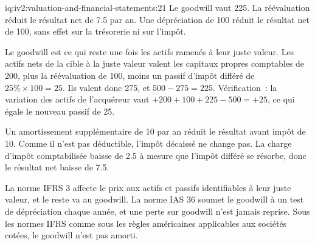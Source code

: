 \begin{solution}{iq:iv2:valuation-and-financial-statements:21}
Le goodwill vaut 225. La réévaluation réduit le résultat net de 7.5 par an. Une dépréciation de 100 réduit le résultat net de 100, sans effet sur la trésorerie ni sur l'impôt.

Le goodwill est ce qui reste une fois les actifs ramenés à leur juste valeur. Les actifs nets de la cible à la juste valeur valent les capitaux propres comptables de 200, plus la réévaluation de 100, moins un passif d'impôt différé de $25\% \times 100 = 25$. Ils valent donc 275, et $500 - 275 = 225$. Vérification~: la variation des actifs de l'acquéreur vaut $+200 + 100 + 225 - 500 = +25$, ce qui égale le nouveau passif de 25.

Un amortissement supplémentaire de 10 par an réduit le résultat avant impôt de 10. Comme il n'est pas déductible, l'impôt décaissé ne change pas. La charge d'impôt comptabilisée baisse de 2.5 à mesure que l'impôt différé se résorbe, donc le résultat net baisse de 7.5.

La norme IFRS 3 affecte le prix aux actifs et passifs identifiables à leur juste valeur, et le reste va au goodwill. La norme IAS 36 soumet le goodwill à un test de dépréciation chaque année, et une perte sur goodwill n'est jamais reprise. Sous les normes IFRS comme sous les règles américaines applicables aux sociétés cotées, le goodwill n'est pas amorti.

\end{solution}

